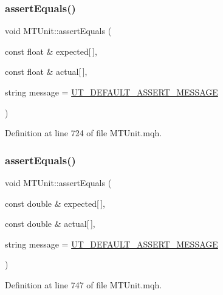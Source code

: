\subsubsection{\texorpdfstring{assert\+Equals()}{assertEquals()}\hspace{0.1cm}{\footnotesize\ttfamily [24/28]}}
{\footnotesize\ttfamily void M\+T\+Unit\+::assert\+Equals (\begin{DoxyParamCaption}\item[{const float \&}]{expected\mbox{[}$\,$\mbox{]},  }\item[{const float \&}]{actual\mbox{[}$\,$\mbox{]},  }\item[{string}]{message = {\ttfamily \mbox{\hyperlink{_m_t_unit_8mqh_a96f5d62188d09039ebc3f443c9120e39}{U\+T\+\_\+\+D\+E\+F\+A\+U\+L\+T\+\_\+\+A\+S\+S\+E\+R\+T\+\_\+\+M\+E\+S\+S\+A\+GE}}} }\end{DoxyParamCaption})}



Definition at line 724 of file M\+T\+Unit.\+mqh.

\mbox{\label{class_m_t_unit_a118601df140c5ae0a64dbed787ee57fe}} 
\subsubsection{\texorpdfstring{assert\+Equals()}{assertEquals()}\hspace{0.1cm}{\footnotesize\ttfamily [25/28]}}
{\footnotesize\ttfamily void M\+T\+Unit\+::assert\+Equals (\begin{DoxyParamCaption}\item[{const double \&}]{expected\mbox{[}$\,$\mbox{]},  }\item[{const double \&}]{actual\mbox{[}$\,$\mbox{]},  }\item[{string}]{message = {\ttfamily \mbox{\hyperlink{_m_t_unit_8mqh_a96f5d62188d09039ebc3f443c9120e39}{U\+T\+\_\+\+D\+E\+F\+A\+U\+L\+T\+\_\+\+A\+S\+S\+E\+R\+T\+\_\+\+M\+E\+S\+S\+A\+GE}}} }\end{DoxyParamCaption})}



Definition at line 747 of file M\+T\+Unit.\+mqh.

\mbox{\label{class_m_t_unit_ab6b5f7674e23c24b08c0cbc4b8cc7937}} 
